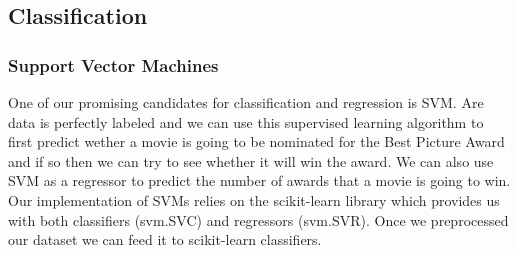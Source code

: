 \documentclass[journal,transmag]{IEEEtran}
\begin{document}
		\subsection{Classification}
		
			\subsubsection{Support Vector Machines}
			
			One of our promising candidates for classification and regression is SVM. Are data is perfectly labeled and we can use this supervised learning algorithm to first predict wether a movie is going to be nominated for the Best Picture Award and if so then we can try to see whether it will win the award. We can also use SVM as a regressor to predict the number of awards that a movie is going to win.\\ 
Our implementation of SVMs relies on the scikit-learn library which provides us with both classifiers (svm.SVC) and regressors (svm.SVR). Once we preprocessed our dataset we can feed it to scikit-learn classifiers.
\end{document}
